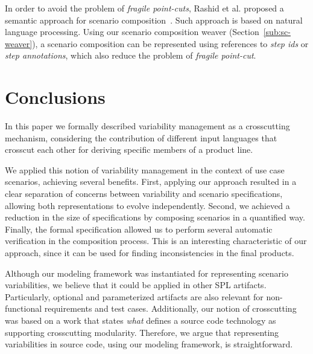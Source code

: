 \documentclass{acm_proc_article-sp}
\begin{document}
In order to avoid the problem of \emph{fragile point-cuts}, Rashid
et al. proposed a semantic approach for scenario
composition~\cite{rashid-aosd-2007}. Such approach is based on
natural language processing. Using our scenario composition weaver
(Section~\ref{sub:sc-weaver}), a scenario composition can be
represented using references to \emph{step ids} or \emph{step annotations}, 
which also reduce the problem of \emph{fragile point-cut}.

\section{Conclusions}\label{sec:conclusions}

In this paper we formally described variability management as a 
crosscutting mechanism, considering the contribution 
of different input languages that crosscut each other for deriving 
specific members of a product line. 

We applied this notion of variability management in the context of use 
case scenarios, achieving several benefits. First, applying our approach resulted in 
a clear separation of concerns between variability and scenario specifications, 
allowing both representations to evolve independently. Second, we achieved a reduction 
in the size of specifications by composing scenarios in a quantified way. Finally, the 
formal specification allowed us to perform several automatic verification in the composition 
process. This is an interesting characteristic of our approach, since it can be used 
for finding inconsistencies in the final products.

Although our modeling framework was instantiated for representing 
scenario variabilities, we believe that it could be applied in 
other SPL artifacts. Particularly, optional and parameterized artifacts 
are also relevant for non-functional requirements and test cases. 
Additionally, our notion of crosscutting was based on a work that states \emph{what} 
defines a source code technology as supporting crosscutting modularity. Therefore, 
we argue that representing variabilities in source code, using our modeling framework, 
is straightforward.   


%
%



\end{document}
